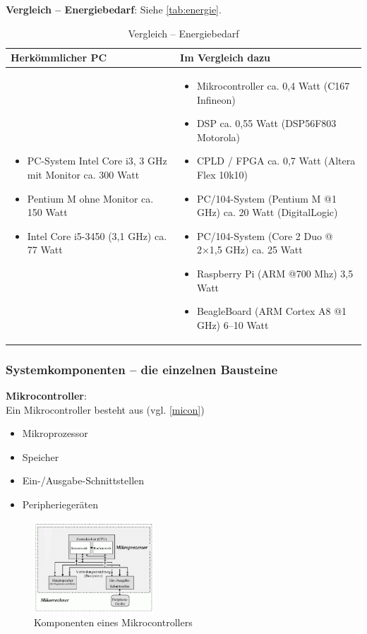 \textbf{Vergleich – Energiebedarf}: Siehe \autoref{tab:energie}.
\begin{table}[hbt]
\centering
\begin{tabular}{|p{5cm}|p{11cm}|}
\hline
\textbf{Herkömmlicher PC} & \textbf{Im Vergleich dazu} \\
\hline
\hline
\begin{itemize}
\item PC-System Intel Core i3, 3 GHz mit Monitor ca. 300 Watt
\item Pentium M ohne Monitor ca. 150 Watt
\item Intel Core i5-3450 (3,1 GHz) ca. 77 Watt
\end{itemize} &
\begin{itemize}
\item Mikrocontroller ca. 0,4 Watt (C167 Infineon)
\item DSP ca. 0,55 Watt (DSP56F803 Motorola)
\item CPLD / FPGA ca. 0,7 Watt (Altera Flex 10k10)
\item PC/104-System (Pentium M @1 GHz) ca. 20 Watt (DigitalLogic)
\item PC/104-System (Core 2 Duo @ 2×1,5 GHz) ca. 25 Watt
\item Raspberry Pi (ARM @700 Mhz) 3,5 Watt
\item BeagleBoard (ARM Cortex A8 @1 GHz) 6–10 Watt
\end{itemize}\\
\hline
\end{tabular}
\caption{Vergleich – Energiebedarf}
\label{tab:energie}
\end{table}
\subsubsection{Systemkomponenten – die einzelnen Bausteine}
\textbf{Mikrocontroller}:\\ Ein Mikrocontroller besteht aus (vgl. \autoref{micon})
\begin{itemize}
\item Mikroprozessor
\item Speicher
\item Ein-/Ausgabe-Schnittstellen
\item Peripheriegeräten
\end{itemize}
\begin{figure}[h!]
	\centering
	\includegraphics[width=0.4\textwidth]{figures/ch07_microcon.png}
	\caption{Komponenten eines Mikrocontrollers}
	\label{micon}
\end{figure}

